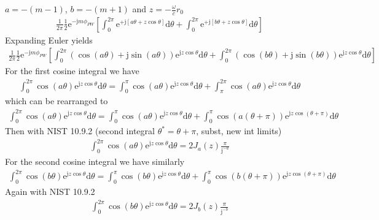 \documentclass[a4paper,BCOR=15mm,10pt,twoside]{scrartcl}
\newcommand\e{\mathrm{e}}  %
\newcommand\im{\mathrm{j}}  %
\newcommand\fsd{\mathrm{d}}  %
\begin{document}
$a=-(m-1)$, $b=-(m+1)$ and $z=-\frac{\omega}{c} r_0 $ 
\begin{align}
\frac{1}{2\pi}
\frac{1}{2}
\e^{- \im m \phi_{PW}}
[
\int_0^{2\pi} \mathrm{e}^{+\mathrm{j}[a \theta + z \cos\theta]} \fsd \theta +
\int_0^{2\pi} \mathrm{e}^{+\mathrm{j}[b \theta + z \cos\theta]} \fsd \theta
]
\end{align}
Expanding Euler yields
\begin{align}
\frac{1}{2\pi}
\frac{1}{2}
\e^{- \im m \phi_{PW}}
[
\int_0^{2\pi} (\cos(a\theta)+\im \sin(a\theta)) \mathrm{e}^{\mathrm{j} z \cos\theta} \fsd \theta+
\int_0^{2\pi} (\cos(b\theta)+\im \sin(b\theta)) \mathrm{e}^{\mathrm{j} z \cos\theta} \fsd \theta
]
\end{align}
For the first cosine integral we have
\begin{align}
\int_0^{2\pi} \cos(a\theta) \mathrm{e}^{\mathrm{j} z \cos\theta} \fsd \theta =
\int_0^{\pi} \cos(a\theta) \mathrm{e}^{\mathrm{j} z \cos\theta} \fsd \theta  + 
\int_\pi^{2\pi} \cos(a\theta) \mathrm{e}^{\mathrm{j} z \cos\theta} \fsd \theta 
\end{align}
which can be rearranged to
\begin{align}
\int_0^{2\pi} \cos(a\theta) \mathrm{e}^{\mathrm{j} z \cos\theta} \fsd \theta =
\int_0^{\pi} \cos(a\theta) \mathrm{e}^{\mathrm{j} z \cos\theta} \fsd \theta  + 
\int_0^{\pi} \cos(a(\theta+\pi)) \mathrm{e}^{\mathrm{j} z \cos(\theta+\pi)} \fsd \theta 
\end{align}
Then with NIST 10.9.2 (second integral $\theta^* = \theta + \pi$, subst, new int limits)
\begin{align}
\int_0^{2\pi} \cos(a\theta) \mathrm{e}^{\mathrm{j} z \cos\theta} \fsd \theta =
2 J_{a}(z) \frac{\pi}{\im^{-a}}
\end{align}
For the second cosine integral we have similarly
\begin{align}
\int_0^{2\pi} \cos(b\theta) \mathrm{e}^{\mathrm{j} z \cos\theta} \fsd \theta = 
\int_0^{\pi} \cos(b\theta) \mathrm{e}^{\mathrm{j} z \cos\theta} \fsd \theta +
\int_0^{\pi} \cos(b(\theta+\pi)) \mathrm{e}^{\mathrm{j} z \cos(\theta+\pi)} \fsd \theta
\end{align}
Again with NIST 10.9.2
\begin{align}
\int_0^{2\pi} \cos(b\theta) \mathrm{e}^{\mathrm{j} z \cos\theta} \fsd \theta = 
2 J_{b}(z) \frac{\pi}{\im^{-b}}
\end{align}
\end{document}
